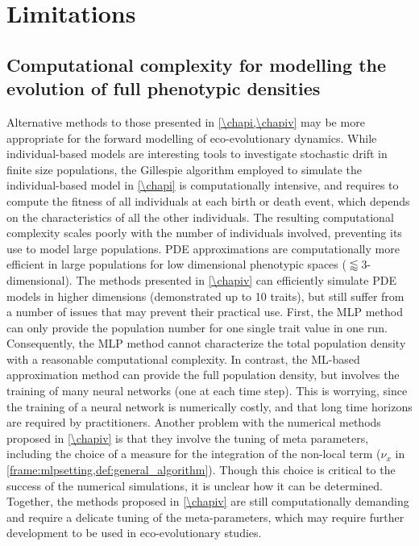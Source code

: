 \section{Limitations}
\label{sec:limitations}
\subsection{Computational complexity for modelling the evolution of full phenotypic densities}
Alternative methods to those presented in \cref{\chapi,\chapiv} may be more appropriate for the forward modelling of eco-evolutionary dynamics.
% 
While individual-based models are interesting tools to investigate stochastic drift in finite size populations, the Gillespie algorithm \citep{Gillespie1976} employed to simulate the individual-based model in \cref{\chapi} is computationally intensive, and requires to compute the fitness of all individuals at each birth or death event, which depends on the characteristics of all the other individuals. The resulting computational complexity scales poorly with the number of individuals involved, preventing its use to model large populations. 
% 
PDE approximations are computationally more efficient in large populations for low dimensional phenotypic spaces ($\lessapprox 3$-dimensional). 
% 
% 
The methods presented in \cref{\chapiv} can efficiently simulate PDE models in higher dimensions (demonstrated up to 10 traits), but still suffer from a number of issues that may prevent their practical use.
% 
First, the MLP method can only provide the population number for one single trait value in one run. Consequently, the MLP method cannot characterize the total population density with a reasonable computational complexity. 
% 
In contrast, the ML-based approximation method can provide the full population density, but involves the training of many neural networks (one at each time step). This is worrying, since the training of a neural network is numerically costly, and that long time horizons are required by practitioners. Another problem with the numerical methods proposed in \cref{\chapiv} is that they involve the tuning of meta parameters, including the choice of a measure for the integration of the non-local term ($\nu_x$ in \cref{frame:mlpsetting,def:general_algorithm}). Though this choice is critical to the success of the numerical simulations, it is unclear how it can be determined.
% 
Together, the methods proposed in \cref{\chapiv} are still computationally demanding and require a delicate tuning of the meta-parameters, which may require further development to be used in eco-evolutionary studies. 

